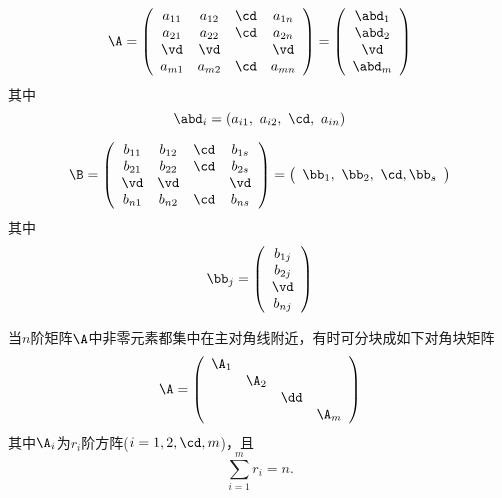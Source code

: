 \begin{frame}\ft{\secname}
\begin{dingyi}[矩阵的按行分块]
  $$
  \A = \left(
    \begin{array}{cccc}
      a_{11} & a_{12} & \cd & a_{1n}\\
      a_{21} & a_{22} & \cd & a_{2n}\\
      \vd & \vd & & \vd \\
      a_{m1} & a_{m2} & \cd & a_{mn}
    \end{array}
  \right)
  = \left(
    \begin{array}{c}
      \abd_1\\
      \abd_2\\
      \vd \\
      \abd_m
    \end{array}
  \right)
  $$
  其中
  $$
  \abd_i = (a_{i1}, ~a_{i2}, ~\cd, ~a_{in})
  $$
\end{dingyi}
\end{frame}

\begin{frame}\ft{\secname}
\begin{dingyi}[矩阵的按列分块]
  $$
  \B = \left(
    \begin{array}{cccc}
      b_{11} & b_{12} & \cd & b_{1s}\\
      b_{21} & b_{22} & \cd & b_{2s}\\
      \vd & \vd & & \vd \\
      b_{n1} & b_{n2} & \cd & b_{ns}
    \end{array}
  \right)
  = \left(
    \begin{array}{c}
      \bb_1, ~ \bb_2, ~ \cd, \bb_s
    \end{array}
  \right)
  $$
  其中
  $$
  \bb_j = \left(
    \begin{array}{c}
      b_{1j}\\
      b_{2j}\\
      \vd\\
      b_{nj}
    \end{array}
  \right)
  $$
\end{dingyi}
\end{frame}

\begin{frame}\ft{\secname}
当$n$阶矩阵$\A$中非零元素都集中在主对角线附近，有时可分块成如下\textcolor{acolor3}{对角块矩阵}
$$
\A = \left(
  \begin{array}{cccc}
    \A_1 & & &\\
    &\A_2&&\\
    &&\dd&\\
    &&&\A_m
  \end{array}
\right)
$$
其中$\A_i$为$r_i$阶方阵($i=1,2,\cd,m$)，且
$$
\sum_{i=1}^m r_i = n.
$$

\end{frame}

